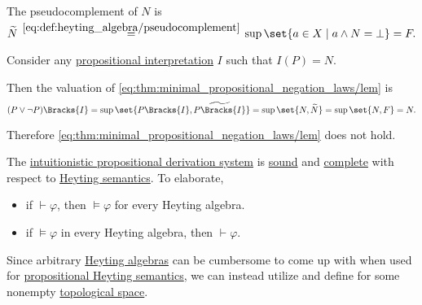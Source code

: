 \begin{proposition}
\begin{proposition}
\begin{example}
  The pseudocomplement of \( N \) is
  \begin{equation*}
    \widetilde{N}
    \reloset {\eqref{eq:def:heyting_algebra/pseudocomplement}} =
    \sup\set{ a \in X \given a \wedge N = \bot }
    =
    F.
  \end{equation*}

  Consider any \hyperref[def:propositional_valuation]{propositional interpretation} \( I \) such that \( I(P) = N \).

  Then the valuation of \eqref{eq:thm:minimal_propositional_negation_laws/lem} is
  \begin{equation*}
    (P \vee \neg P)\Bracks{I}
    =
    \sup\set{ P\Bracks{I}, \widetilde{P\Bracks{I}} }
    =
    \sup\set{ N, \widetilde{N} }
    =
    \sup\set{ N, F }
    =
    N.
  \end{equation*}

  Therefore \eqref{eq:thm:minimal_propositional_negation_laws/lem} does not hold.
\end{example}

\begin{theorem}\label{thm:intuitionistic_propositional_logic_is_sound_and_complete}
  The \hyperref[def:intuitionistic_propositional_derivation_system]{intuitionistic propositional derivation system} is \hyperref[def:derivability_and_satisfiability/soundness]{sound} and \hyperref[def:derivability_and_satisfiability/completeness]{complete} with respect to \hyperref[def:propositional_heyting_algebra_semantics]{Heyting semantics}. To elaborate,
  \begin{itemize}
    \item if \( \vdash \varphi \), then \( \vDash \varphi \) for every Heyting algebra.
    \item if \( \vDash \varphi \) in every Heyting algebra, then \( \vdash \varphi \).
  \end{itemize}
\end{theorem}

\begin{definition}\label{def:propositional_topological_semantics}
  Since arbitrary \hyperref[def:heyting_algebra]{Heyting algebras} can be cumbersome to come up with when used for \hyperref[def:propositional_heyting_algebra_semantics]{propositional Heyting semantics}, we can instead utilize  and define  for some nonempty \hyperref[def:topological_space]{topological space}.


\end{definition}
\end{proposition}
\end{proposition}
